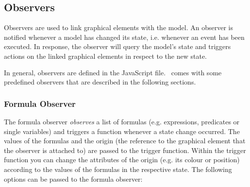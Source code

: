 %
%

\subsection{Observers}
\label{b_observers}

Observers are used to link graphical elements with the model. 
An observer is notified whenever a model has changed its state, i.e. whenever an event has been executed. 
In response, the observer will query the model's state and triggers actions on the linked graphical elements in respect to the new state. 

In general, observers are defined in the JavaScript file. 
\bms~comes with some predefined observers that are described in the following sections.

\subsubsection{Formula Observer}

The formula observer \textit{observes} a list of formulas (e.g.  expressions, predicates or single variables) and triggers a function whenever a state change occurred.
The values of the formulas and the origin (the reference to the graphical element that the observer is attached to) are passed to the trigger function.
Within the trigger function you can change the attributes of the origin (e.g. its colour or position) according to the values of the formulas in the respective state.
The following options can be passed to the formula observer:

